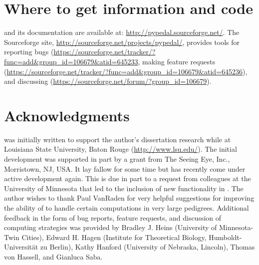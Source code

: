 \section{Where to get information and code}
\PyPedal{} and its documentation are available at: \url{http://pypedal.sourceforge.net/}.  The Sourceforge site, \url{http://sourceforge.net/projects/pypedal/}, provides tools for reporting bugs (\url{https://sourceforge.net/tracker/?func=add&group_id=106679&atid=645233}, making feature requests (\url{https://sourceforge.net/tracker/?func=add&group_id=106679&atid=645236}), and discussing \PyPedal{} (\url{https://sourceforge.net/forum/?group_id=106679}).

\section{Acknowledgments}
\PyPedal{} was initially written to support the author's dissertation research while at Louisiana State University, Baton Rouge (\url{http://www.lsu.edu/}).  The initial development was supported in part by a grant from The Seeing Eye, Inc., Morristown, NJ, USA.  It lay fallow for some time but has recently come under active development again.  This is due in part to a request from colleagues at the University of Minnesota that led to the inclusion of new functionality in \PyPedal{}.  The author wishes to thank Paul Van{R}aden for very helpful suggestions for improving the ability of \PyPedal{} to handle certain computations in very large pedigrees.  Additional feedback in the form of bug reports, feature requests, and discussion of computing strategies was provided by Bradley J. Heins (University of Minnesota-Twin Cities), Edward H. Hagen (Institute for Theoretical Biology, Humboldt-Universit\"{a}t zu Berlin), Kathy Hanford (University of Nebraska, Lincoln), Thomas von Hassell, and Gianluca Saba.